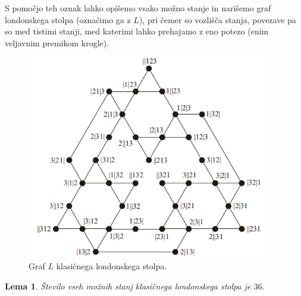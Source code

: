 \documentclass[12pt,a4paper]{amsart}
\theoremstyle{definition} %
\theoremstyle{plain} %
\newtheorem{lema}[definicija]{Lema}
\begin{document}
S pomočjo teh oznak lahko opišemo vsako možno stanje in narišemo graf londonskega stolpa (označimo ga z $L$), pri čemer so vozlišča stanja, povezave pa so med tistimi stanji, med katerimi lahko prehajamo z eno potezo (enim veljavnim premikom krogle).

\begin{figure}[h!]
    \includegraphics[width=300pt]{img/tolgraph.png}
    \caption{Graf $L$ klasičnega londonskega stolpa.}
    \label{fig:tolgraph}
\end{figure}

\begin{lema}
    \label{lem:stanja-klas-lond}
    Število vseh možnih stanj klasičnega londonskega stolpa je $36$.
\end{lema}
\end{document}

